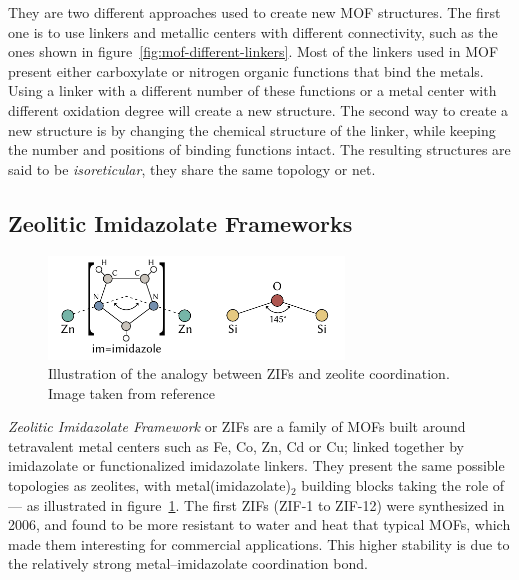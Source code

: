 \documentclass[thesis]{subfiles}
\begin{document}
They are two different approaches used to create new MOF structures. The first
one is to use linkers and metallic centers with different connectivity, such as
the ones shown in figure~\ref{fig:mof-different-linkers}. Most of the linkers
used in MOF present either carboxylate or nitrogen organic functions that bind
the metals. Using a linker with a different number of these functions or a metal
center with different oxidation degree will create a new structure. The second
way to create a new structure is by changing the chemical structure of the
linker, while keeping the number and positions of binding functions intact. The
resulting structures are said to be \emph{isoreticular}, \ie they share the same
topology or net.


\subsection{Zeolitic Imidazolate Frameworks}

\begin{figure}[ht]
    \centering
    \includegraphics[width=0.7\textwidth]{figures/images/zeolite-to-zif}
    \caption{Illustration of the analogy between ZIFs and zeolite coordination.
    Image taken from reference~\cite{Bennett2010}}
    \label{fig:zeolite-to-zif}
\end{figure}

\emph{Zeolitic Imidazolate Framework} or ZIFs are a family of MOFs built around
tetravalent  metal centers such as Fe, Co, Zn, Cd or Cu; linked
together by imidazolate or functionalized imidazolate linkers. They present the
same possible topologies as zeolites, with metal(imidazolate)$_2$ building
blocks taking the role of  --- as illustrated in
figure~\ref{fig:zeolite-to-zif}. The first ZIFs (ZIF-1 to ZIF-12) were
synthesized in 2006\cite{Park2006}, and found to be more resistant to water and
heat that typical MOFs, which made them interesting for commercial applications.
This higher stability is due to the relatively strong metal--imidazolate
coordination bond.
\end{document}
